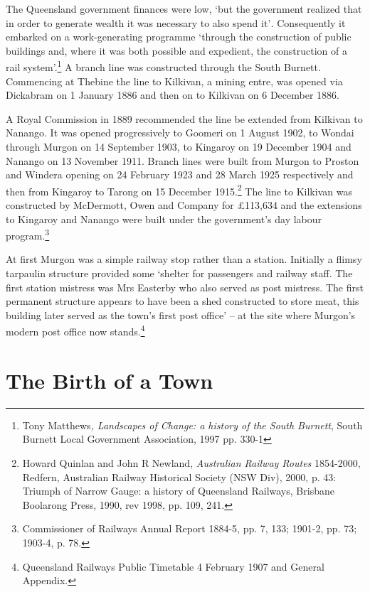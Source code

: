 The Queensland government finances were low, `but the government realized that in order to generate wealth it was necessary to also spend it'\emph{.} Consequently it embarked on a work-generating programme `through the construction of public buildings and, where it was both possible and expedient, the construction of a rail system'.\footnote{Tony Matthews\emph{, Landscapes of Change: a history of the South Burnett}, South Burnett Local Government Association, 1997 pp. 330-1} A branch line was constructed through the South Burnett. Commencing at Thebine the line to Kilkivan, a mining entre, was opened via Dickabram on 1 January 1886 and then on to Kilkivan on 6 December 1886.


A Royal Commission in 1889 recommended the line be extended from Kilkivan to Nanango. It was opened progressively to Goomeri on 1 August 1902, to Wondai through Murgon on 14 September 1903, to Kingaroy on 19 December 1904 and Nanango on 13 November 1911. Branch lines were built from Murgon to Proston and Windera opening on 24 February 1923 and 28 March 1925 respectively and then from Kingaroy to Tarong on 15 December 1915.\footnote{Howard Quinlan and John R Newland, \emph{Australian Railway Routes} 1854-2000, Redfern, Australian Railway Historical Society (NSW Div), 2000, p. 43: Triumph of Narrow Gauge: a history of Queensland Railways, Brisbane Boolarong Press, 1990, rev 1998, pp. 109, 241.} The line to Kilkivan was constructed by McDermott, Owen and Company for \pounds113,634 and the extensions to Kingaroy and Nanango were built under the government's day labour program.\footnote{Commissioner of Railways Annual Report 1884-5, pp. 7, 133; 1901-2, pp. 73; 1903-4, p. 78.}


At first Murgon was a simple railway stop rather than a station. Initially a flimsy tarpaulin structure provided some `shelter for passengers and railway staff. The first station mistress was Mrs Easterby who also served as post mistress. The first permanent structure appears to have been a shed constructed to store meat, this building later served as the town's first post office' -- at the site where Murgon's modern post office now stands.\footnote{Queensland Railways Public Timetable 4 February 1907 and General Appendix.}


\balance


\printendnotes[custom]
\setcounter{endnote}{0}
\chapter{The Birth of a Town}
\nobalance


